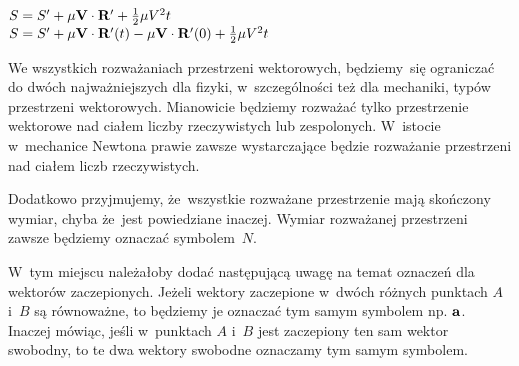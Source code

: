 \documentclass[a4paper,11pt]{article}
\begin{document}
\noindent
{} \\
\Jest  $S = S' + \mu \mathbf{V} \cdot \mathbf{R}' + \frac{ 1 }{ 2 } \mu V^{ 2 } t$ \\
\Powin $S = S' + \mu \mathbf{V} \cdot \mathbf{R}'( t ) - \mu \mathbf{V}
\cdot \mathbf{R}'( 0 ) + \frac{ 1 }{ 2 } \mu V^{ 2 } t$ \\













\newpage


\vspace{0em}



\vspace{0em}


We wszystkich rozważaniach przestrzeni wektorowych, będziemy~się ograniczać
do dwóch najważniejszych dla fizyki, w~szczególności też dla mechaniki,
typów przestrzeni wektorowych. Mianowicie będziemy rozważać tylko
przestrzenie wektorowe nad ciałem liczby rzeczywistych lub zespolonych.
W~istocie w~mechanice Newtona prawie zawsze wystarczające będzie rozważanie
przestrzeni nad ciałem liczb rzeczywistych.

Dodatkowo przyjmujemy, że~wszystkie rozważane przestrzenie mają skończony
wymiar, chyba że~jest powiedziane inaczej. Wymiar rozważanej przestrzeni
zawsze będziemy oznaczać symbolem~$N$.

\vspace{\spaceFour}







\noindent
{} W~tym miejscu należałoby dodać następującą uwagę na temat oznaczeń
dla wektorów zaczepionych. Jeżeli wektory zaczepione w~dwóch różnych
punktach $A$ i~$B$ są równoważne, to będziemy je oznaczać tym samym symbolem
np. $\mathbf{a}$. Inaczej mówiąc, jeśli w~punktach $A$ i~$B$ jest zaczepiony
ten sam wektor swobodny, to te dwa wektory swobodne oznaczamy tym samym
symbolem.
\end{document}
